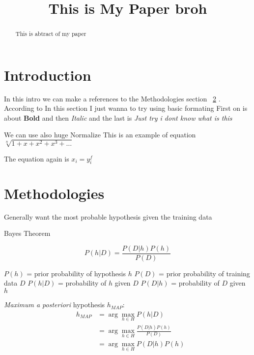 \documentclass[conference]{IEEEtran}
\begin{document}
\title{This is My Paper broh}
\author{
}

\maketitle

\begin{abstract}
This is abtract of my paper
\end{abstract}

\section{Introduction}
\label{sec:intro}
In this intro we can make a references to the Methodologies section ~\ref{sec:meth} . According to \cite{contoh1}
In this section I just wanna to try using basic formating
First on is about \textbf{Bold} and then \textit{Italic} and the last is {\it Just try i dont know what is this} 

We can use also \huge{huge} \normalsize{Normalize}
This is an example of equation
$ \sqrt[n]{1+x+x^2+x^3+\ldots} $

The equation again is $ x_i = y_i^f $

\section{Methodologies}
\label{sec:meth}



Generally want the most probable hypothesis given the training data


{\huge Bayes Theorem  }

\[ P(h|D) = \frac{P(D|h) P(h)}{P(D)} \]


 $P(h)$ = prior probability of hypothesis $h$
 $P(D)$ = prior probability of training data $D$
 $P(h|D)$ = probability of $h$ given $D$
 $P(D|h)$ = probability of $D$ given $h$

{\em Maximum a posteriori} hypothesis $h_{MAP}$:
\begin{eqnarray}
& h_{MAP} & = \arg \max_{h \in H} P(h|D)\nonumber \\
& & = \arg \max_{h \in H} \frac{P(D|h) P(h)}{P(D)} \nonumber \\
& & = \arg \max_{h \in H}P(D|h) P(h) \nonumber
\end{eqnarray}
\end{document}

